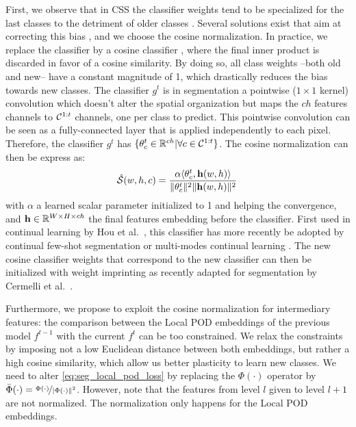First, we observe that in \ac{CSS} the classifier weights tend to be specialized for the last classes to
the detriment of older classes \cite{hou2019ucir}. Several solutions exist that aim at correcting
this bias
\cite{wu2019bias_correction,belouadah2019il2m,zhao2020weightalignement,luo2018cosine_classifier}, and
we choose the cosine normalization. In practice, we replace the classifier by a cosine classifier
\cite{luo2018cosine_classifier}, where the final inner product is discarded in favor of a cosine
similarity. By doing so, all class weights --both old and new-- have a constant magnitude of 1,
which drastically reduces the bias towards new classes. The classifier $g^t$ is in segmentation a
pointwise ($1\times1$ kernel) convolution which doesn't alter the spatial organization but maps the
$ch$ features channels to $\mathcal{C}^{1:t}$ channels, one per class to predict. This pointwise
convolution can be seen as a fully-connected layer that is applied independently to each pixel.
Therefore, the classifier $g^t$ has $\{\theta_c^t \in \mathbb{R}^{ch} | \forall c \in \mathcal{C}^{1:t}\}$.
The cosine normalization can then be express as:
%
\begin{equation}
    \hat{\mathcal{S}}(w, h, c) = \frac{\alpha \langle \theta^t_c, \mathbf{h}(w, h) \rangle}{\Vert \theta^t_c \Vert^2 \Vert \mathbf{h}(w, h) \Vert^2}\,
    \label{eq:seg_cosine_classifier}
\end{equation}
%
with $\alpha$ a learned scalar parameter initialized to 1 and helping the convergence, and $\mathbf{h} \in
    \mathbb{R}^{W \times H \times ch}$ the final features embedding before the classifier. First
used in continual learning by Hou et al.~\cite{hou2019ucir}, this classifier has more recently
be adopted by continual few-shot segmentation \cite{cermelli2020fewshotcontinualsegm} or
multi-modes continual learning \cite{douillard2020podnet}. The new cosine classifier weights
that correspond to the new classifier can then be initialized with weight imprinting
\cite{qi2018imprintedweights} as recently adapted for segmentation by Cermelli et
al.~\cite{cermelli2020fewshotcontinualsegm}.

Furthermore, we propose to exploit the cosine normalization for intermediary features: the
comparison between the Local POD embeddings of the previous model $f^{t-1}$ with the current $f^t$
can be too constrained. We relax the constraints by imposing not a low Euclidean distance between
both embeddings, but rather a high cosine similarity, which allow us better plasticity to learn new
classes. We need to alter \autoref{eq:seg_local_pod_loss} by replacing the $\Phi(\cdot)$ operator by
$\bar{\Phi}(\cdot) = \nicefrac{\Phi(\cdot)}{\vert\Phi(\cdot)\Vert^2}$. However, note that the
features from level $l$ given to level $l+1$ are not normalized. The normalization only happens for
the Local POD embeddings.

